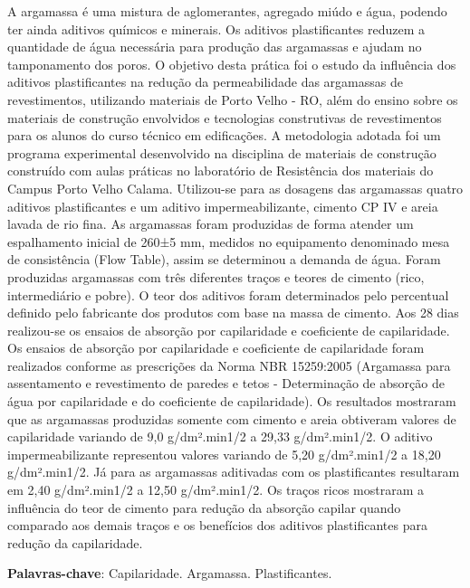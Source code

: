 \documentclass[article,12pt,onesidea,4paper,english,brazil]{abntex2}
\begin{document}
	\noindent A argamassa é uma mistura de aglomerantes, agregado miúdo e água, podendo ter
	ainda aditivos químicos e minerais. Os aditivos plastificantes reduzem a quantidade
	de água necessária para produção das argamassas e ajudam no tamponamento dos
	poros. O objetivo desta prática foi o estudo da influência dos aditivos plastificantes
	na redução da permeabilidade das argamassas de revestimentos, utilizando
	materiais de Porto Velho - RO, além do ensino sobre os materiais de construção
	envolvidos e tecnologias construtivas de revestimentos para os alunos do curso
	técnico em edificações. A metodologia adotada foi um programa experimental
	desenvolvido na disciplina de materiais de construção construído com aulas práticas
	no laboratório de Resistência dos materiais do Campus Porto Velho Calama.
	Utilizou-se para as dosagens das argamassas quatro aditivos plastificantes e um
	aditivo impermeabilizante, cimento CP IV e areia lavada de rio fina. As argamassas
	foram produzidas de forma atender um espalhamento inicial de 260±5 mm, medidos
	no equipamento denominado mesa de consistência (Flow Table), assim se
	determinou a demanda de água. Foram produzidas argamassas com três diferentes
	traços e teores de cimento (rico, intermediário e pobre). O teor dos aditivos foram
	determinados pelo percentual definido pelo fabricante dos produtos com base na
	massa de cimento. Aos 28 dias realizou-se os ensaios de absorção por capilaridade
	e coeficiente de capilaridade. Os ensaios de absorção por capilaridade e coeficiente
	de capilaridade foram realizados conforme as prescrições da Norma NBR
	15259:2005 (Argamassa para assentamento e revestimento de paredes e tetos -
	Determinação de absorção de água por capilaridade e do coeficiente de
	capilaridade). Os resultados mostraram que as argamassas produzidas somente
	com cimento e areia obtiveram valores de capilaridade variando de 9,0 g/dm².min1/2
	a 29,33 g/dm².min1/2. O aditivo impermeabilizante representou valores variando de
	5,20 g/dm².min1/2 a 18,20 g/dm².min1/2. Já para as argamassas aditivadas com os
	plastificantes resultaram em 2,40 g/dm².min1/2 a 12,50 g/dm².min1/2. Os traços ricos
	mostraram a influência do teor de cimento para redução da absorção capilar quando
	comparado aos demais traços e os benefícios dos aditivos plastificantes para
	redução da capilaridade.
	
	\vspace{\onelineskip}
	
	\noindent
	\textbf{Palavras-chave}: Capilaridade. Argamassa. Plastificantes.
	
\end{document}
